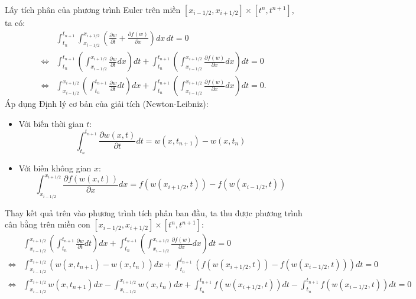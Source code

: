 Lấy tích phân của phương trình Euler trên miền $[x_{i - 1/2}, x_{i + 1/2}] \times [t^n, t^{n+1}]$, ta có:
\begin{equation*}
    \begin{aligned}
        &\int_{t_n}^{t_{n+1}} \int_{x_{i-1/2}}^{x_{i+1/2}} \left( \frac{\partial w}{\partial t} + \frac{\partial f(w)}{\partial x} \right) dx \, dt = 0 \\
        \Leftrightarrow & \int_{t_n}^{t_{n+1}} \left( \int_{x_{i-1/2}}^{x_{i+1/2}}\frac{\partial w}{\partial t} dx \right) dt + \int_{t_n}^{t_{n+1}} \left( \int_{x_{i-1/2}}^{x_{i+1/2}} \frac{\partial f(w)}{\partial x} dx \right) dt = 0 \\
        \Leftrightarrow &\int_{x_{i-1/2}}^{x_{i+1/2}} \left( \int_{t_n}^{t_{n+1}} \frac{\partial w}{\partial t} dt \right) dx + \int_{t_n}^{t_{n+1}} \left( \int_{x_{i-1/2}}^{x_{i+1/2}} \frac{\partial f(w)}{\partial x} dx \right) dt = 0.
    \end{aligned}
\end{equation*}
Áp dụng Định lý cơ bản của giải tích (Newton-Leibniz):
\begin{itemize}
    \item Với biến thời gian $t$:
    $$ \int_{t_n}^{t_{n+1}} \frac{\partial w(x,t)}{\partial t} dt = w(x, t_{n+1}) - w(x, t_n) $$
    \item Với biến không gian $x$:
    $$ \int_{x_{i-1/2}}^{x_{i+1/2}} \frac{\partial f(w(x,t))}{\partial x} dx = f(w(x_{i+1/2}, t)) - f(w(x_{i-1/2}, t)) $$
\end{itemize}
Thay kết quả trên vào phương trình tích phân ban đầu, ta thu được phương trình cân bằng trên miền con $[x_{i - 1/2}, x_{i + 1/2}] \times [t^n, t^{n+1}]$:
\begin{equation*}
    \begin{aligned}
        &\int_{x_{i-1/2}}^{x_{i+1/2}} \left( \int_{t_n}^{t_{n+1}} \frac{\partial w}{\partial t} dt \right) dx + \int_{t_n}^{t_{n+1}} \left( \int_{x_{i-1/2}}^{x_{i+1/2}} \frac{\partial f(w)}{\partial x} dx \right) dt = 0 \\
       \Leftrightarrow &\int_{x_{i-1/2}}^{x_{i+1/2}} \left( w(x, t_{n+1}) - w(x, t_n)\right) dx + \int_{t_n}^{t_{n+1}} \left( f(w(x_{i+1/2}, t)) - f(w(x_{i-1/2}, t))\right) dt = 0 \\
        \Leftrightarrow &\int_{x_{i-1/2}}^{x_{i+1/2}} w(x, t_{n+1}) dx - \int_{x_{i-1/2}}^{x_{i+1/2}} w(x, t_n) dx + \int_{t_n}^{t_{n+1}} f(w(x_{i+1/2}, t)) dt - \int_{t_n}^{t_{n+1}} f(w(x_{i-1/2}, t)) dt = 0
    \end{aligned}
\end{equation*}

